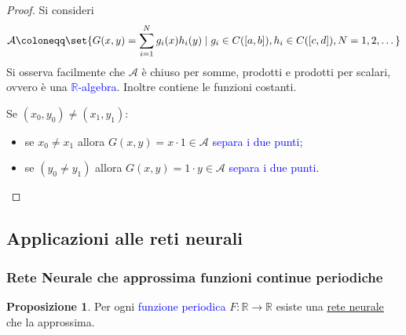 \documentclass[10pt]{book}
\newcommand{\1}{\mathds{1}}
\newcommand{\R}{\mathds{R}}
\theoremstyle{definition}%
\newtheorem{prop}[thm]{Proposizione}
\theoremstyle{plain}
\theoremstyle{remark}
\renewcommand{\href}[2]{\textcolor{blue}{#2}}
\begin{document}
\begin{proof}
Si consideri
\begin{equation*}
\mathcal{A}\coloneqq \set{
G(x,y) = \sum_{i=1}^{N} g_{i}(x)h_{i}(y)\mid g_{i} \in C([a,b]), h_{i} \in C([c,d]), N = 1,2,\dots
}
\end{equation*}
Si osserva facilmente che \(\mathcal{A}\) è chiuso per somme, prodotti e prodotti per scalari, ovvero è una \href{../../../../../org/roam/20250629165520-algebra_di_funzioni_reali.org}{\(\R\)-algebra}. Inoltre contiene le funzioni costanti.

Se \((x_{0},y_{0})\neq (x_{1},y_{1})\):
\begin{itemize}
\item se \(x_{0}\neq x_{1}\) allora \(G(x,y) = x\cdot 1 \in \mathcal{A}\) \href{../../../../../org/roam/20250629151420-algebra_di_funzioni_separa_i_punti.org}{separa i due punti};
\item se \((y_{0}\neq y_{1})\) allora \(G(x,y) = 1\cdot y \in \mathcal{A}\) \href{../../../../../org/roam/20250629151420-algebra_di_funzioni_separa_i_punti.org}{separa i due punti}.\qedhere
\end{itemize}
\end{proof}
\subsection{Applicazioni alle reti neurali}
\label{sec:org09d3ee1}

\subsubsection{Rete Neurale che approssima funzioni continue periodiche}
\label{sec:org04d660e}
\begin{prop}
Per ogni \href{../../../../../org/roam/20250630103918-funzione_periodica.org}{funzione periodica} \(F:\R\to \R\) esiste una \hyperref[sec:org1346ff2]{rete neurale} che la approssima.
\end{prop}
\end{document}
